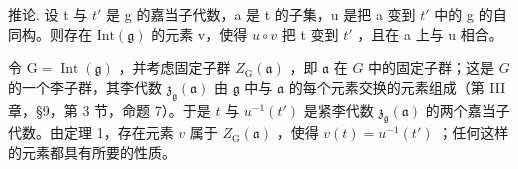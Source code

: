 推论. 设 t 与 \(t'\) 是 g 的嘉当子代数，a 是 t 的子集，u 是把 a 变到 \(t'\) 中的 g 的自同构。则存在 \(\text{Int}(\mathfrak{g})\) 的元素 v，使得 \(u \circ v\) 把 t 变到 \(t'\) ，且在 a 上与 u 相合。

令 \(\mathrm{G} = \operatorname{Int}(\mathfrak{g})\) ，并考虑固定子群 \(Z_{\mathrm{G}}(\mathfrak{a})\) ，即 \(\mathfrak{a}\) 在 \(G\) 中的固定子群；这是 \(G\) 的一个李子群，其李代数 \(\mathfrak{z}_{\mathfrak{g}}(\mathfrak{a})\) 由 \(\mathfrak{g}\) 中与 \(\mathfrak{a}\) 的每个元素交换的元素组成（第 III 章，§9，第 3 节，命题 7）。于是 \(t\) 与 \(u^{-1}(t')\) 是紧李代数 \(\mathfrak{z}_{\mathfrak{g}}(\mathfrak{a})\) 的两个嘉当子代数。由定理 1，存在元素 \(v\) 属于 \(Z_{\mathrm{G}}(\mathfrak{a})\) ，使得 \(v(t) = u^{-1}(t')\) ；任何这样的元素都具有所要的性质。

